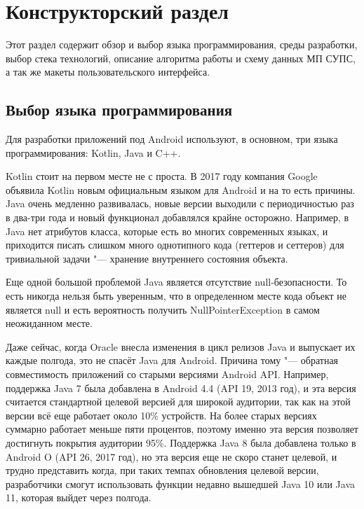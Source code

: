 \chapter{Конструкторский раздел}
\label{ch:design}

Этот раздел содержит обзор и выбор языка программирования, среды разработки, выбор стека технологий, описание алгоритма работы и схему
данных МП СУПС, а так же макеты пользовательского интерфейса.

\section{Выбор языка программирования}
\label{sec:language}
Для разработки приложений под Android используют, в основном, три языка программирования: Kotlin, Java и C++.

Kotlin стоит на первом месте не с проста.
В 2017 году компания Google объявила Kotlin новым официальным языком для Android и на то есть причины.
Java очень медленно развивалась, новые версии выходили с периодичностью раз в два-три года и новый функционал добавлялся крайне осторожно.
Например, в Java нет атрибутов класса, которые есть во многих современных языках, и приходится писать слишком много однотипного кода (геттеров и сеттеров) для тривиальной задачи "--- хранение внутреннего состояния объекта.

Еще одной большой проблемой Java является отсутствие null-безопасности.
То есть никогда нельзя быть уверенным, что в определенном месте кода объект не является null и есть вероятность получить NullPointerException в самом неожиданном месте.

Даже сейчас, когда Oracle внесла изменения в цикл релизов Java и выпускает их каждые полгода, это не спасёт Java для Android.
Причина тому "--- обратная совместимость приложений со старыми версиями Android API\@.
Например, поддержка Java 7 была добавлена в Android 4.4 (API 19, 2013 год), и эта версия считается стандартной целевой версией для широкой аудитории, так как на этой версии всё еще работает около 10\% устройств.
На более старых версиях суммарно работает меньше пяти процентов, поэтому именно эта версия позволяет достигнуть покрытия аудитории 95\%.
Поддержка Java 8 была добавлена только в Android O (API 26, 2017 год), но эта версия еще не скоро станет целевой, и трудно представить когда, при таких темпах обновления целевой версии, разработчики смогут использовать функции недавно вышедшей Java 10 или Java 11, которая выйдет через полгода.

